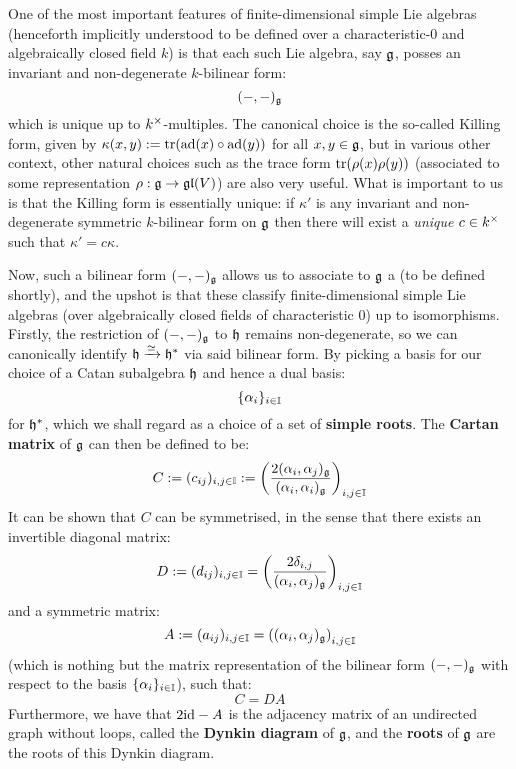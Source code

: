         One of the most important features of finite-dimensional simple Lie algebras (henceforth implicitly understood to be defined over a characteristic-$0$ and algebraically closed field $k$) is that each such Lie algebra, say $\mathfrak{g}$, posses an invariant and non-degenerate $k$-bilinear form:
            $$(-, -)_{\mathfrak{g}}$$
        which is unique up to $k^{\x}$-multiples. The canonical choice is the so-called Killing form, given by $\kappa(x, y) := \operatorname{tr}(\mathrm{ad}(x) \circ \mathrm{ad}(y))$ for all $x, y \in \mathfrak{g}$, but in various other context, other natural choices such as the trace form $\operatorname{tr}(\rho(x) \rho(y))$ (associated to some representation $\rho: \mathfrak{g} \to \mathfrak{gl}(V)$) are also very useful. What is important to us is that the Killing form is essentially unique: if $\kappa'$ is any invariant and non-degenerate symmetric $k$-bilinear form on $\mathfrak{g}$ then there will exist a \textit{unique} $c \in k^{\x}$ such that $\kappa' = c \kappa$.

        Now, such a bilinear form $(-, -)_{\mathfrak{g}}$ allows us to associate to $\mathfrak{g}$ a  (to be defined shortly), and the upshot is that these  classify finite-dimensional simple Lie algebras (over algebraically closed fields of characteristic $0$) up to isomorphisms. Firstly, the restriction of $(-, -)_{\mathfrak{g}}$ to $\mathfrak{h}$ remains non-degenerate, so we can canonically identify $\mathfrak{h} \xrightarrow[]{\simeq} \mathfrak{h}^*$ via said bilinear form. By picking a basis for our choice of a Catan subalgebra $\mathfrak{h}$ and hence a dual basis:
            $$\{\alpha_i\}_{i \in \mathbb{I}}$$
        for $\mathfrak{h}^*$, which we shall regard as a choice of a set of \textbf{simple roots}. The \textbf{Cartan matrix} of $\mathfrak{g}$ can then be defined to be:
            $$C := (c_{ij})_{i, j \in \mathbb{I}} := \left( \frac{2(\alpha_i, \alpha_j)_{\mathfrak{g}}}{(\alpha_i, \alpha_i)_{\mathfrak{g}}} \right)_{i, j \in \mathbb{I}}$$
        It can be shown that $C$ can be symmetrised, in the sense that there exists an invertible diagonal matrix:
            $$D := (d_{ij})_{i, j \in \mathbb{I}} = \left(\frac{2\delta_{i, j}}{(\alpha_i, \alpha_j)_{\mathfrak{g}}}\right)_{i, j \in \mathbb{I}}$$
        and a symmetric matrix:
            $$A := (a_{ij})_{i, j \in \mathbb{I}} = \left((\alpha_i, \alpha_j)_{\mathfrak{g}}\right)_{i, j \in \mathbb{I}}$$
        (which is nothing but the matrix representation of the bilinear form $(-, -)_{\mathfrak{g}}$ with respect to the basis $\{\alpha_i\}_{i \in \mathbb{I}}$), such that:
            $$C = DA$$
        Furthermore, we have that $2\mathrm{id} - A$ is the adjacency matrix of an undirected graph without loops, called the \textbf{Dynkin diagram} of $\mathfrak{g}$, and the \textbf{roots} of $\mathfrak{g}$ are the roots of this Dynkin diagram. 

